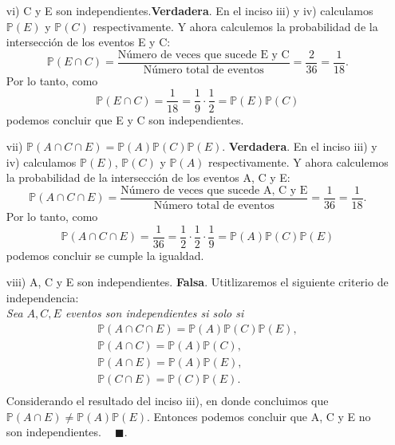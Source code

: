 \documentclass[11pt,letterpaper]{article}
\newcommand{\mP}{\mathbb{P}}
\newcommand{\finf}{\blacksquare.}
\begin{document}
\begin{itemize}
\begin{itemize}
\item[vi)] C y E son independientes.\textbf{Verdadera}. En el inciso iii) y iv) calculamos $\mP(E)$ y $\mP(C)$ respectivamente. Y ahora calculemos la probabilidad de la intersección de los eventos E y C:
$$\mP(E\cap C)= \frac{\text{Número de veces que sucede E y C}}{\text{Número total de eventos}}=\frac{2}{36}=\frac{1}{18}.$$
Por lo tanto, como
$$\mP(E\cap C)= \frac{1}{18} = \frac{1}{9}\cdot \frac{1}{2}=\mP(E)\mP(C)$$
podemos concluir que E y C son independientes.

\item[vii)] $\mP (A \cap C \cap E) = \mP (A)\mP (C)\mP (E)$. \textbf{Verdadera}. En el inciso iii) y iv) calculamos $\mP(E)$, $\mP(C)$ y $\mP(A)$ respectivamente. Y ahora calculemos la probabilidad de la intersección de los eventos A, C y E:
$$\mP(A\cap C\cap E)= \frac{\text{Número de veces que sucede A, C y E}}{\text{Número total de eventos}}=\frac{1}{36}=\frac{1}{18}.$$
Por lo tanto, como
$$\mP(A\cap C\cap E)= \frac{1}{36} = \frac{1}{2}\cdot \frac{1}{2} \cdot\frac{1}{9}=\mP(A)\mP(C)\mP(E)$$
podemos concluir se cumple la igualdad. 

\item[viii)] A, C y E son
independientes. \textbf{Falsa}. Utitlizaremos el siguiente criterio de independencia:\\

\textit{Sea $A, C, E$ eventos son independientes si solo si
\begin{equation*}
\begin{array}{c}
\mP(A\cap C \cap E) =\mP(A)\mP(C)\mP(E),\\
\mP(A\cap C)= \mP(A)\mP(C),\\
\mP(A\cap E)= \mP(A)\mP(E),\\
\mP(C\cap E)= \mP(C)\mP(E).\\
\end{array}
\end{equation*}
}
Considerando el resultado del inciso iii), en donde concluimos que $\mP(A\cap E)\neq\mP(A)\mP(E)$. Entonces podemos concluir que A, C y E no son independientes. $\ \ \ \ \finf$
\end{itemize}
\end{itemize}
\end{document}
